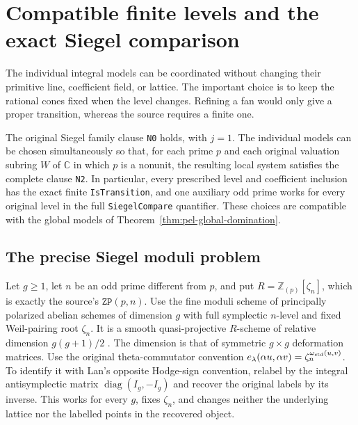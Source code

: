 \section{Compatible finite levels and the exact Siegel comparison}
\label{sec:pel-level-system}

The individual integral models can be coordinated without changing
their primitive line, coefficient field, or lattice.  The important
choice is to keep the rational cones fixed when the level changes.
Refining a fan would only give a proper transition, whereas the source
requires a finite one.

\begin{theorem}
\label{thm:pel-level-system}
The original Siegel family clause \texttt{N0} holds, with $j=1$.
The individual models can be chosen simultaneously so that, for
each prime $p$ and each original valuation subring $W$ of $\mathbb C$
in which $p$ is a nonunit, the resulting local system satisfies
the complete clause \texttt{N2}.
In particular, every prescribed level and coefficient inclusion has
the exact finite \texttt{IsTransition}, and one auxiliary odd prime
works for every original level in the full \texttt{SiegelCompare}
quantifier.  These choices are compatible with the global models of
Theorem~\ref{thm:pel-global-domination}.
\end{theorem}

\subsection*{The precise Siegel moduli problem}

Let $g\geq1$, let $n$ be an odd prime different from $p$, and put
$R=\mathbb Z_{(p)}[\zeta_n]$, which is exactly the source's
$\texttt{ZP}(p,n)$.  Use the fine moduli scheme of principally
polarized abelian schemes of dimension $g$ with full symplectic
$n$-level and fixed Weil-pairing root $\zeta_n$.  It is a smooth
quasi-projective $R$-scheme of relative dimension $g(g+1)/2$
\cite[Theorem 1.4.1.11, Corollaries 1.4.1.12 and 7.2.3.10]{level-system-lan}.
The dimension is that of symmetric $g\times g$ deformation matrices.
Use the original theta-commutator convention
$e_\lambda(\alpha u,\alpha v)=\zeta_n^{\omega_{\rm std}(u,v)}$.
To identify it with Lan's opposite Hodge-sign convention, relabel
by the integral antisymplectic matrix $\operatorname{diag}(I_g,-I_g)$
and recover the original labels by its inverse.  This works for every
$g$, fixes $\zeta_n$, and changes neither the underlying lattice nor
the labelled points in the recovered object.

